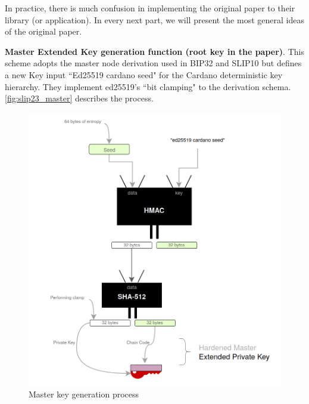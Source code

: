 In practice, there is much confusion in implementing the original paper to their library (or application). In every next part, we will present the most general ideas of the original paper.

\bigskip
{\textbf{Master Extended Key generation function (root key in the paper)}}. This scheme adopts the master node derivation used in BIP32 and SLIP10 but defines a new Key input ``Ed25519 cardano seed" for the Cardano deterministic key hierarchy. They implement ed25519's ``bit clamping" to the derivation schema.
\autoref{fig:slip23_master} describes the process.

\begin{figure}[ht!]
    \centering
    \includegraphics[width=1\textwidth]{images/slip23_master.png}
    \caption[Master key generation process]{Master key generation process}
    \label{fig:slip23_master}
\end{figure}

